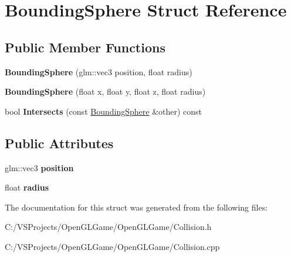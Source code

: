 \hypertarget{struct_bounding_sphere}{\section{Bounding\-Sphere Struct Reference}
\label{struct_bounding_sphere}
}
\subsection*{Public Member Functions}
\begin{DoxyCompactItemize}
\item 
\hypertarget{struct_bounding_sphere_a48e6dbb5ac9c43be7d2b8e9c1c04465e}{{\bfseries Bounding\-Sphere} (glm\-::vec3 position, float radius)}\label{struct_bounding_sphere_a48e6dbb5ac9c43be7d2b8e9c1c04465e}

\item 
\hypertarget{struct_bounding_sphere_a8759fef1f9f01bd29356062080b4afd0}{{\bfseries Bounding\-Sphere} (float x, float y, float z, float radius)}\label{struct_bounding_sphere_a8759fef1f9f01bd29356062080b4afd0}

\item 
\hypertarget{struct_bounding_sphere_ad5338a15f0189ca28da84957de297766}{bool {\bfseries Intersects} (const \hyperlink{struct_bounding_sphere}{Bounding\-Sphere} \&other) const }\label{struct_bounding_sphere_ad5338a15f0189ca28da84957de297766}

\end{DoxyCompactItemize}
\subsection*{Public Attributes}
\begin{DoxyCompactItemize}
\item 
\hypertarget{struct_bounding_sphere_a30fc292b65171a57266b8313e91989da}{glm\-::vec3 {\bfseries position}}\label{struct_bounding_sphere_a30fc292b65171a57266b8313e91989da}

\item 
\hypertarget{struct_bounding_sphere_a569e503fe2d0d2ffbb220cf443b8b9fb}{float {\bfseries radius}}\label{struct_bounding_sphere_a569e503fe2d0d2ffbb220cf443b8b9fb}

\end{DoxyCompactItemize}


The documentation for this struct was generated from the following files\-:\begin{DoxyCompactItemize}
\item 
C\-:/\-V\-S\-Projects/\-Open\-G\-L\-Game/\-Open\-G\-L\-Game/Collision.\-h\item 
C\-:/\-V\-S\-Projects/\-Open\-G\-L\-Game/\-Open\-G\-L\-Game/Collision.\-cpp\end{DoxyCompactItemize}
